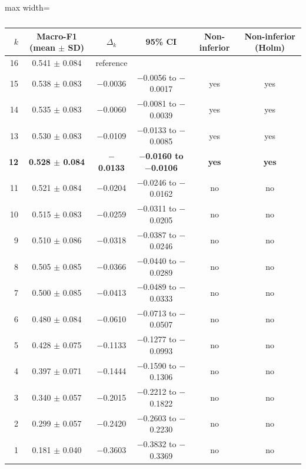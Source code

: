 \begin{table}[t]
\centering
\small
\caption{}
\label{tab:sparse_ni}
\setlength{\tabcolsep}{4pt}
\begin{adjustbox}{max width=\textwidth}
\begin{tabular}{rccccc}
\toprule
$k$ & Macro-F1 (mean $\pm$ SD) & $\Delta_k$ & 95\% CI & Non-inferior & Non-inferior (Holm) \\
\midrule
16 & 0.541 $\pm$ 0.084 & reference &  &  &  \\
15 & 0.538 $\pm$ 0.083 & $-$0.0036 & $-$0.0056 to $-$0.0017 & yes & yes \\
14 & 0.535 $\pm$ 0.083 & $-$0.0060 & $-$0.0081 to $-$0.0039 & yes & yes \\
13 & 0.530 $\pm$ 0.083 & $-$0.0109 & $-$0.0133 to $-$0.0085 & yes & yes \\
\textbf{12} & \textbf{0.528 $\pm$ 0.084} & \textbf{$-$0.0133} & \textbf{$-$0.0160 to $-$0.0106} & \textbf{yes} & \textbf{yes} \\
\midrule 11 & 0.521 $\pm$ 0.084 & $-$0.0204 & $-$0.0246 to $-$0.0162 & no & no \\
10 & 0.515 $\pm$ 0.083 & $-$0.0259 & $-$0.0311 to $-$0.0205 & no & no \\
9 & 0.510 $\pm$ 0.086 & $-$0.0318 & $-$0.0387 to $-$0.0246 & no & no \\
8 & 0.505 $\pm$ 0.085 & $-$0.0366 & $-$0.0440 to $-$0.0289 & no & no \\
7 & 0.500 $\pm$ 0.085 & $-$0.0413 & $-$0.0489 to $-$0.0333 & no & no \\
6 & 0.480 $\pm$ 0.084 & $-$0.0610 & $-$0.0713 to $-$0.0507 & no & no \\
5 & 0.428 $\pm$ 0.075 & $-$0.1133 & $-$0.1277 to $-$0.0993 & no & no \\
4 & 0.397 $\pm$ 0.071 & $-$0.1444 & $-$0.1590 to $-$0.1306 & no & no \\
3 & 0.340 $\pm$ 0.057 & $-$0.2015 & $-$0.2212 to $-$0.1822 & no & no \\
2 & 0.299 $\pm$ 0.057 & $-$0.2420 & $-$0.2603 to $-$0.2230 & no & no \\
1 & 0.181 $\pm$ 0.040 & $-$0.3603 & $-$0.3832 to $-$0.3369 & no & no \\
\bottomrule
\end{tabular}
\end{adjustbox}
\end{table}
